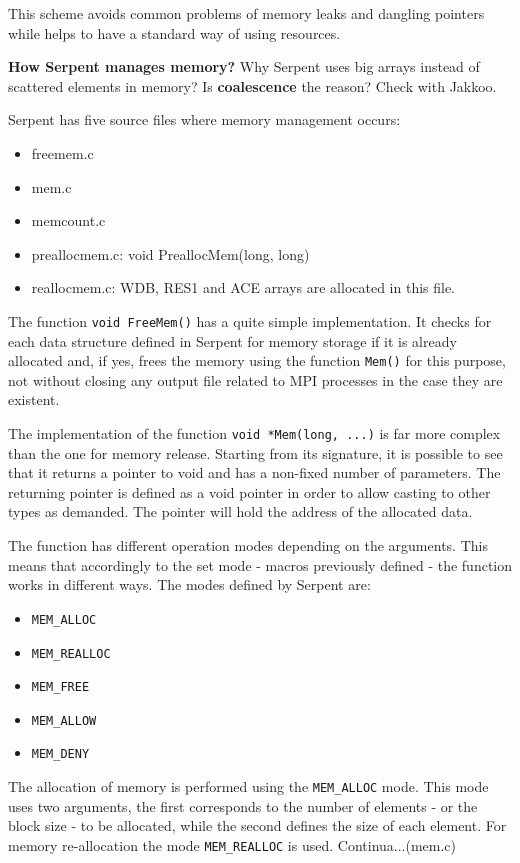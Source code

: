 \documentclass[twoside,a4paper,12pt,english,draft]{anstrans}
\begin{document}
This scheme avoids common problems of memory leaks and dangling pointers while helps to
have a standard way of using resources.

\textbf{How Serpent manages memory?}
Why Serpent uses big arrays instead of scattered elements in memory?
Is \textbf{coalescence} the reason? Check with Jakkoo.

Serpent has five source files where memory management occurs:
\begin{itemize}
\item freemem.c
\item mem.c
\item memcount.c
\item preallocmem.c: void PreallocMem(long, long)
\item reallocmem.c: WDB, RES1 and ACE arrays are allocated in this file.
\end{itemize}

The function \texttt{void FreeMem()} has a quite simple implementation. It checks for each data structure
defined in Serpent for memory storage if it is already allocated and, if yes, frees the memory using
the function \texttt{Mem()} for this purpose, not without closing any output file related to MPI processes
in the case they are existent.

The implementation of the function \texttt{void *Mem(long, ...)} is far more complex than the one for
memory release. Starting from its signature, it is possible to see that it returns a pointer to void
and has a non-fixed number of parameters. The returning pointer is defined as a void pointer in order
to allow casting to other types as demanded. The pointer will hold the address of the allocated data.

The function has different operation modes depending on the arguments. This means that accordingly to the set mode - macros
previously defined - the function works in different ways. The modes defined by Serpent are:

\begin{itemize}
\item \texttt{MEM\_ALLOC}
\item \texttt{MEM\_REALLOC}
\item \texttt{MEM\_FREE}
\item \texttt{MEM\_ALLOW}
\item \texttt{MEM\_DENY}
\end{itemize} 

The allocation of memory is performed using the \texttt{MEM\_ALLOC} mode. This mode uses two arguments, the first
corresponds to the number of elements - or the block size - to be allocated, while the second defines the size of each element.
For memory re-allocation the mode \texttt{MEM\_REALLOC} is used. Continua...(mem.c)
\end{document}
